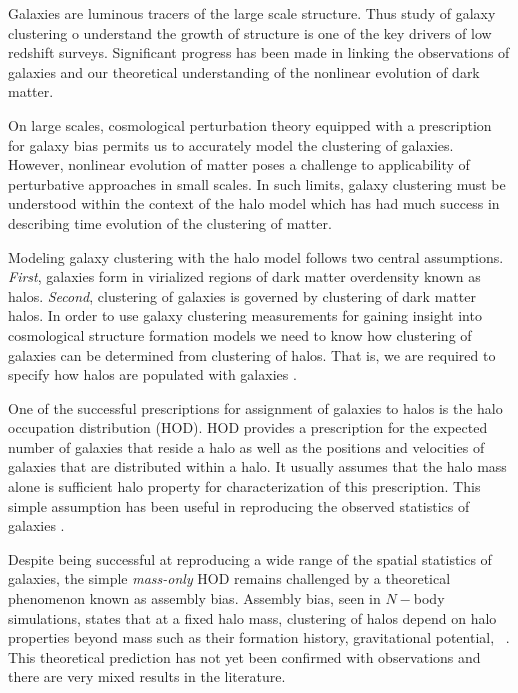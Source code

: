 Galaxies are luminous tracers of the large scale structure. Thus study of galaxy clustering o understand the growth of structure is 
one of the key drivers of low redshift surveys. Significant progress has been made in linking the observations of 
galaxies and our theoretical understanding of the nonlinear evolution of dark matter. 

On large scales, cosmological perturbation theory equipped with a prescription for galaxy bias permits us 
to accurately model the clustering of galaxies. However, nonlinear evolution of matter 
poses a challenge to applicability of perturbative approaches in small scales. In such limits, 
galaxy clustering must be understood within the context of the halo model which has had 
much success in describing time evolution of the clustering of matter.  

Modeling galaxy clustering with the halo model follows two central assumptions. \emph{First}, galaxies form in virialized regions of 
dark matter overdensity known as halos. \emph{Second}, clustering of galaxies is governed by clustering of dark matter halos. 
In order to use galaxy clustering measurements for gaining insight into cosmological structure formation models we need to 
know how clustering of galaxies can be determined from clustering of halos. That is, we are required to specify how halos 
are populated with galaxies \citep{seljak2000,scoccimarro2001,berlind_weinberg2002}.

One of the successful prescriptions for assignment of galaxies to halos is the halo occupation distribution (HOD). 
HOD provides a prescription for the expected number of galaxies that reside a halo as well as 
the positions and velocities of galaxies that are distributed within a halo. It usually assumes that the halo mass alone 
is sufficient halo property for characterization of this prescription. This simple assumption has been useful 
in reproducing the observed statistics of galaxies \citep{tinker_rsd2007,zehavi2011,zheng_guo}.

Despite being successful at reproducing a wide range of the spatial statistics of galaxies, the simple \emph{mass-only} HOD 
remains challenged by a theoretical phenomenon known as assembly bias. Assembly bias, seen in $N-$body simulations, states that at a fixed halo mass, clustering 
of halos depend on halo properties beyond mass such as their formation history, gravitational potential, \etc\ \citep{weschler2006,gao2007,arz2014,sunayama2016}.
This theoretical prediction has not yet been confirmed with observations and there are very mixed results in the literature.


